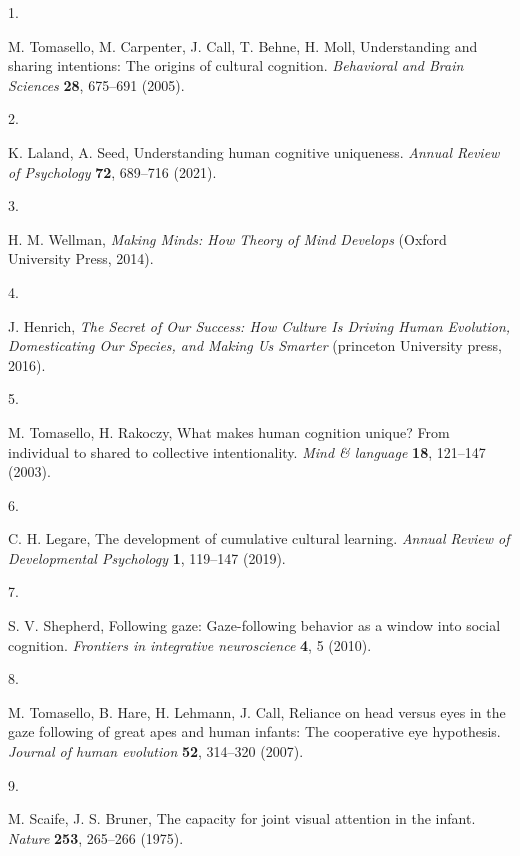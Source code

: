 \documentclass[
  man,floatsintext]{apa6}
\newlength{\cslhangindent}
\newlength{\csllabelwidth}
\newlength{\cslentryspacingunit} %
\newenvironment{CSLReferences}[2] %
 {%
  \setlength{\parindent}{0pt}
  \ifodd #1
  \let\oldpar\par
  \def\par{\hangindent=\cslhangindent\oldpar}
  \fi
  \setlength{\parskip}{#2\cslentryspacingunit}
 }%
 {}
\newcommand{\CSLLeftMargin}[1]{\parbox[t]{\csllabelwidth}{#1}}
\newcommand{\CSLRightInline}[1]{\parbox[t]{\linewidth - \csllabelwidth}{#1}\break}
\begin{document}
\hypertarget{refs}{}
\begin{CSLReferences}{0}{0}
\leavevmode{}%
\CSLLeftMargin{1. }%
\CSLRightInline{M. Tomasello, M. Carpenter, J. Call, T. Behne, H. Moll, Understanding and sharing intentions: The origins of cultural cognition. \emph{Behavioral and Brain Sciences} \textbf{28}, 675--691 (2005).}

\leavevmode{}%
\CSLLeftMargin{2. }%
\CSLRightInline{K. Laland, A. Seed, Understanding human cognitive uniqueness. \emph{Annual Review of Psychology} \textbf{72}, 689--716 (2021).}

\leavevmode{}%
\CSLLeftMargin{3. }%
\CSLRightInline{H. M. Wellman, \emph{Making Minds: How Theory of Mind Develops} (Oxford University Press, 2014).}

\leavevmode{}%
\CSLLeftMargin{4. }%
\CSLRightInline{J. Henrich, \emph{The Secret of Our Success: How Culture Is Driving Human Evolution, Domesticating Our Species, and Making Us Smarter} (princeton University press, 2016).}

\leavevmode{}%
\CSLLeftMargin{5. }%
\CSLRightInline{M. Tomasello, H. Rakoczy, What makes human cognition unique? From individual to shared to collective intentionality. \emph{Mind \& language} \textbf{18}, 121--147 (2003).}

\leavevmode{}%
\CSLLeftMargin{6. }%
\CSLRightInline{C. H. Legare, The development of cumulative cultural learning. \emph{Annual Review of Developmental Psychology} \textbf{1}, 119--147 (2019).}

\leavevmode{}%
\CSLLeftMargin{7. }%
\CSLRightInline{S. V. Shepherd, Following gaze: Gaze-following behavior as a window into social cognition. \emph{Frontiers in integrative neuroscience} \textbf{4}, 5 (2010).}

\leavevmode{}%
\CSLLeftMargin{8. }%
\CSLRightInline{M. Tomasello, B. Hare, H. Lehmann, J. Call, Reliance on head versus eyes in the gaze following of great apes and human infants: The cooperative eye hypothesis. \emph{Journal of human evolution} \textbf{52}, 314--320 (2007).}

\leavevmode{}%
\CSLLeftMargin{9. }%
\CSLRightInline{M. Scaife, J. S. Bruner, The capacity for joint visual attention in the infant. \emph{Nature} \textbf{253}, 265--266 (1975).}


\end{CSLReferences}
\end{document}
